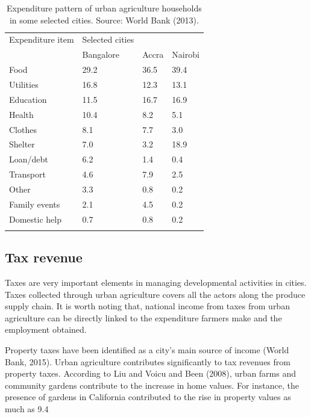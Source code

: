 \begin{table}[th]
\caption{Expenditure pattern of urban agriculture households in some selected cities. Source: World Bank (2013).}
\begin{center}
\begin{tabular}{ p{} p{} p{} p{} } 
\hline
Expenditure item & Selected cities &  &  \\
  & Bangalore & Accra & Nairobi \\
\hline
Food & 29.2 & 36.5 & 39.4 \\
Utilities & 16.8 & 12.3 & 13.1 \\
Education & 11.5 & 16.7 & 16.9 \\
Health & 10.4 & 8.2 & 5.1 \\
Clothes & 8.1 & 7.7 & 3.0 \\
Shelter & 7.0 & 3.2 & 18.9 \\
Loan/debt & 6.2 & 1.4 & 0.4 \\
Transport & 4.6 & 7.9 & 2.5 \\
Other & 3.3 & 0.8 & 0.2 \\
Family events & 2.1 & 4.5 & 0.2 \\
Domestic help & 0.7 & 0.8 & 0.2 \\
\hline
\label{tbl:expenditurePattern}
\end{tabular}
\end{center}
\end{table}

\subsection{Tax revenue}

Taxes are very important elements in managing developmental activities in cities. Taxes collected through urban agriculture covers all the actors along the produce supply chain. It is worth noting that, national income from taxes from urban agriculture can be directly linked to the expenditure farmers make and the employment obtained.

Property taxes have been identified as a city's main source of income (World Bank, 2015). Urban agriculture contributes significantly to tax revenues from property taxes. According to Liu \cite{RIZWAN2008} and Voicu and Been (2008), urban farms and community gardens contribute to the increase in home values. For instance, the presence of gardens in California contributed to the rise in property values as much as 9.4%

